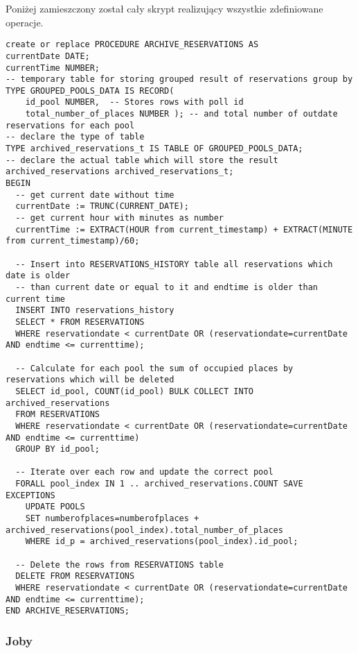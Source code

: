 \documentclass[a4paper]{article}
\begin{document}
Poniżej zamieszczony został cały skrypt realizujący wszystkie zdefiniowane operacje.

\newpage

\begin{verbatim}
create or replace PROCEDURE ARCHIVE_RESERVATIONS AS
currentDate DATE;
currentTime NUMBER;
-- temporary table for storing grouped result of reservations group by
TYPE GROUPED_POOLS_DATA IS RECORD(
    id_pool NUMBER,  -- Stores rows with poll id
    total_number_of_places NUMBER ); -- and total number of outdate reservations for each pool
-- declare the type of table
TYPE archived_reservations_t IS TABLE OF GROUPED_POOLS_DATA;
-- declare the actual table which will store the result
archived_reservations archived_reservations_t; 
BEGIN
  -- get current date without time
  currentDate := TRUNC(CURRENT_DATE);
  -- get current hour with minutes as number
  currentTime := EXTRACT(HOUR from current_timestamp) + EXTRACT(MINUTE from current_timestamp)/60; 
    
  -- Insert into RESERVATIONS_HISTORY table all reservations which date is older
  -- than current date or equal to it and endtime is older than current time
  INSERT INTO reservations_history
  SELECT * FROM RESERVATIONS
  WHERE reservationdate < currentDate OR (reservationdate=currentDate AND endtime <= currenttime);
  
  -- Calculate for each pool the sum of occupied places by reservations which will be deleted
  SELECT id_pool, COUNT(id_pool) BULK COLLECT INTO archived_reservations
  FROM RESERVATIONS
  WHERE reservationdate < currentDate OR (reservationdate=currentDate AND endtime <= currenttime)
  GROUP BY id_pool;
  
  -- Iterate over each row and update the correct pool
  FORALL pool_index IN 1 .. archived_reservations.COUNT SAVE EXCEPTIONS
    UPDATE POOLS
    SET numberofplaces=numberofplaces + archived_reservations(pool_index).total_number_of_places
    WHERE id_p = archived_reservations(pool_index).id_pool;
    
  -- Delete the rows from RESERVATIONS table
  DELETE FROM RESERVATIONS
  WHERE reservationdate < currentDate OR (reservationdate=currentDate AND endtime <= currenttime);
END ARCHIVE_RESERVATIONS;
\end{verbatim}


\subsubsection{Joby}
\end{document}
